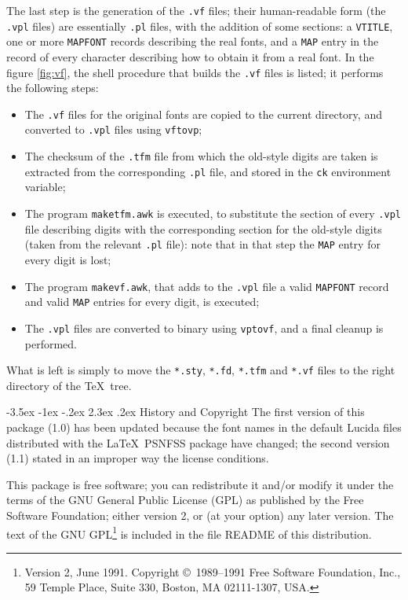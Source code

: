\documentclass[a4paper]{article}
\makeatletter
\renewcommand{\section}{\@startsection {section}{1}{\z@}%
  {-3.5ex \@plus -1ex \@minus -.2ex}%
  {2.3ex \@plus.2ex}%
  {\normalfont\Large\sffamily\bfseries}}
\makeatother
\begin{document}
The last step is the generation of the \verb|.vf| files;
their human-readable form (the \verb|.vpl| files) are
essentially \verb|.pl| files, with the addition of some
sections: a \verb|VTITLE|, one or more \verb|MAPFONT| records
describing the real fonts, and a \verb|MAP| entry in the
record of every character describing how to obtain it from
a real font.
In the figure \ref{fig:vf}, the shell procedure that
builds the \verb|.vf| files is listed; it performs the
following steps:
\begin{itemize}
\item The \verb|.vf| files for the original fonts are copied
  to the current directory, and converted to \verb|.vpl|
  files using \verb|vftovp|;
\item The checksum of the \verb|.tfm| file from which the
  old-style digits are taken is extracted from the
  corresponding \verb|.pl| file, and stored in the \verb|ck|
  environment variable;
\item The program \verb|maketfm.awk| is executed, to
  substitute the section of every \verb|.vpl| file
  describing digits with the corresponding section for the
  old-style digits (taken from the relevant \verb|.pl|
  file): note that in that step the \verb|MAP| entry for
  every digit is lost;
\item The program \verb|makevf.awk|, that adds
  to the \verb|.vpl| file a valid \verb|MAPFONT| record and
  valid \verb|MAP| entries for every digit, is executed;
\item The \verb|.vpl| files are converted to binary using
  \verb|vptovf|, and a final cleanup is performed.
\end{itemize}

What is left is simply to move the \verb|*.sty|,
\verb|*.fd|, \verb|*.tfm| and \verb|*.vf| files to the right
directory of the \TeX\ tree.

\section{History and Copyright}
The first version of this package (1.0) has been updated
because the font names in the default Lucida files
distributed with the \LaTeX\ PSNFSS package have changed;
the second version (1.1) stated in an improper way the
license conditions.

This package is free software; you can redistribute it
and/or modify it under the terms of the GNU General Public
License (GPL) as published by the Free Software Foundation;
either version 2, or (at your option) any later version. The
text of the GNU GPL\footnote{Version 2, June 1991.
  Copyright \copyright\ 1989--1991 Free Software Foundation,
  Inc., 59 Temple Place, Suite 330, Boston, MA 02111-1307,
  USA.} is included in the file README of this distribution.
\end{document}
